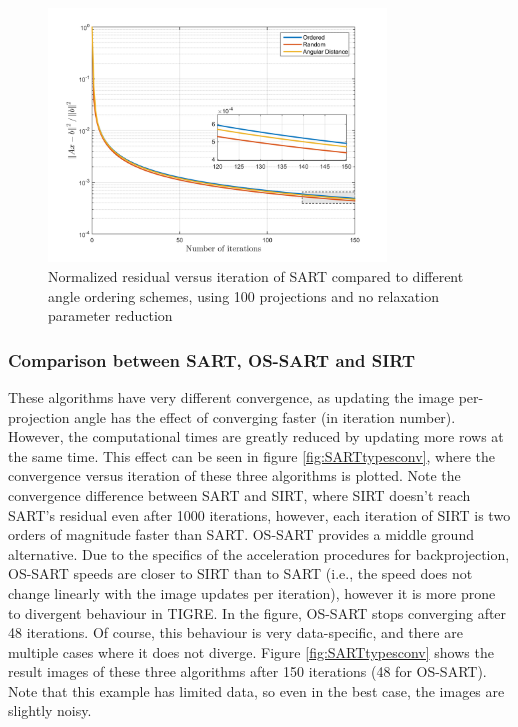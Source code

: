 \begin{figure}[H]
\begin{center}

\includegraphics[width=0.8\textwidth]{Applications/SARTangles.png} 
\end{center}

\caption[Nomralized residual vs iteration of SART vs projection update order]{\label{fig:SARTanglesconv} Normalized residual versus iteration of SART compared to different angle ordering schemes, using 100 projections and no relaxation parameter reduction} 
\end{figure}

\subsubsection{Comparison between SART, OS-SART and SIRT}
These algorithms have very different convergence, as updating the image per-projection angle has the effect of converging faster (in iteration number). However, the computational times are greatly reduced by updating more rows at the same time. This effect can be seen in figure \ref{fig:SARTtypesconv}, where the convergence versus iteration of these three algorithms is plotted. Note the convergence difference between SART and SIRT, where SIRT doesn't reach SART's residual even after 1000 iterations, however, each iteration of SIRT is two orders of magnitude faster than SART. OS-SART provides a middle ground alternative. Due to the specifics of the acceleration procedures for backprojection, OS-SART speeds are closer to SIRT than to SART (i.e., the speed does not change linearly with the image updates per iteration), however it is more prone to divergent behaviour in TIGRE. In the figure, OS-SART stops converging after 48 iterations. Of course, this behaviour is very data-specific, and there are multiple cases where it does not diverge. Figure \ref{fig:SARTtypesconv} shows the result images of these three algorithms after 150 iterations (48 for OS-SART). Note that this example has limited data, so even in the best case, the images are slightly noisy.



